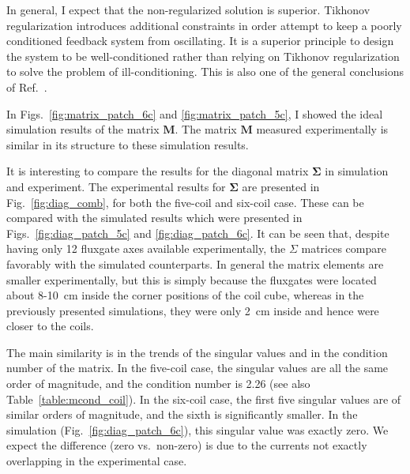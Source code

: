 In general, I expect that the non-regularized solution is superior.
Tikhonov regularization introduces additional constraints in order
attempt to keep a poorly conditioned feedback system from oscillating.
It is a superior principle to design the system to be well-conditioned
rather than relying on Tikhonov regularization to solve the problem of
ill-conditioning.  This is also one of the general conclusions of
Ref.~\cite{rawlik}.

In Figs.~\ref{fig:matrix_patch_6c} and \ref{fig:matrix_patch_5c}, I
showed the ideal simulation results of the matrix $\bm{M}$.  The matrix $\bm{M}$ measured
experimentally is similar in its structure to these simulation
results.


It is interesting to compare the results for the diagonal matrix
$\bm{\Sigma}$ in simulation and experiment.  The experimental results
for $\bm{\Sigma}$ are presented in Fig.~\ref{fig:diag_comb}, for both
the five-coil and six-coil case.  These can be compared with the
simulated results which were presented in
Figs.~\ref{fig:diag_patch_5c} and \ref{fig:diag_patch_6c}.  It can be
seen that, despite having only 12 fluxgate axes available
experimentally, the $\Sigma$ matrices compare favorably with the
simulated counterparts.  In general the matrix elements are smaller
experimentally, but this is simply because the fluxgates were located
about 8-10~cm inside the corner positions of the coil cube, whereas in
the previously presented simulations, they were only 2~cm inside and
hence were closer to the coils.

The main similarity is in the trends of the singular values and in the
condition number of the matrix.  In the five-coil case, the singular
values are all the same order of magnitude, and the condition number
is 2.26 (see also Table~\ref{table:mcond_coil}).  In the six-coil
case, the first five singular values are of similar orders of
magnitude, and the sixth is significantly smaller.  In the simulation
(Fig.~\ref{fig:diag_patch_6c}), this singular value was exactly zero.
We expect the difference (zero vs.~non-zero) is due to the currents
not exactly overlapping in the experimental case.

